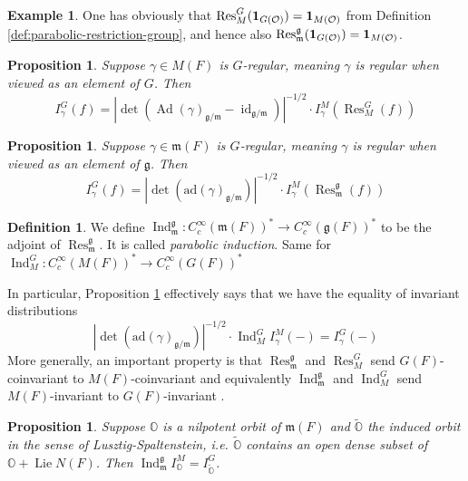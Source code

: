 \documentclass{amsart}
\numberwithin{equation}{section}
\newtheorem{proposition}[lemma]{Proposition}%
\theoremstyle{definition}
\newtheorem{example}[lemma]{Example}%
\newtheorem{definition}[lemma]{Definition}%
\def\16{{\bf 16}}
\def\1{{\bf 1}}
\def\tilde{\widetilde}
\DeclareMathOperator{\Ad}{Ad}
\DeclareMathOperator{\Res}{\mathrm{Res}}
\DeclareMathOperator{\Ind}{\mathrm{Ind}}
\DeclareMathOperator{\id}{\mathrm{id}}
\DeclareMathOperator{\Lie}{Lie}
\newcommand{\cO}{\mathcal{O}}
\newcommand{\fm}{\mathfrak{m}}
\newcommand{\fg}{\mathfrak{g}}
\newcommand{\ad}{\mathrm{ad}}
\begin{document}
\begin{example} One has obviously that $\Res_M^G(\1_{G(\cO)})=\1_{M(\cO)}$ from Definition \ref{def:parabolic-restriction-group}, and hence also $\Res_{\fm}^{\fg}(\1_{G(\cO)})=\1_{M(\cO)}$.
\end{example}

\begin{proposition}
\label{prop:reductiontolevi}
Suppose $\gamma\in M(F)$ is $G$-regular, meaning $\gamma$ is regular when viewed as an element of $G$. Then 
$$I_\gamma^G(f)=\left|\det(\Ad(\gamma)_{\fg/\fm}-\id_{\fg/\fm})\right|^{-1/2}\cdot I_\gamma^M(\Res_M^G(f))$$
\end{proposition}


\begin{proposition}
\label{prop:reductiontolevi-alg}
Suppose $\gamma\in \fm(F)$ is $G$-regular, meaning $\gamma$ is regular when viewed as an element of $\fg$. Then 
$$I_\gamma^G(f)=\left|\det(\ad(\gamma)_{\fg/\fm})\right|^{-1/2}\cdot I_\gamma^M(\Res_{\fm}^{\fg}(f))$$
\end{proposition}



\begin{definition} We define $\Ind_{\fm}^{\fg}:C_c^{\infty}(\fm(F))^*\rightarrow C_c^{\infty}(\fg(F))^*$ to be the adjoint of $\Res_{\fm}^{\fg}$. It is called {\em parabolic induction}. Same for $\Ind_M^G:C_c^{\infty}(M(F))^*\rightarrow C_c^{\infty}(G(F))^*$
\end{definition}

In particular, Proposition \ref{prop:reductiontolevi-alg} effectively says that we have the equality of invariant distributions $$\left|\det(\ad(\gamma)_{\fg/\fm})\right|^{-1/2}\cdot\Ind_M^G I_\gamma^M(-)=I_\gamma^G(-)$$
More generally, an important property is that $\Res_{\fm}^{\fg}$ and $\Res_{M}^{G}$ send $G(F)$-coinvariant to $M(F)$-coinvariant and equivalently $\Ind_{\fm}^{\fg}$ and $\Ind_M^G$ send $M(F)$-invariant to $G(F)$-invariant \cite[Lemma 13.1]{Kottwitz}.

\begin{proposition}\label{induction-unipotent} Suppose $\mathbb{O}$ is a nilpotent orbit of $\fm(F)$ and $\tilde{\mathbb{O}}$ the induced orbit in the sense of Lusztig-Spaltenstein, i.e. $\tilde{\mathbb{O}}$ contains an open dense subset of $\mathbb{O}+\Lie N(F)$. Then $\Ind_{\fm}^{\fg}I_{\mathbb{O}}^M=I_{\tilde{\mathbb{O}}}^G$.
\end{proposition}
\end{document}
